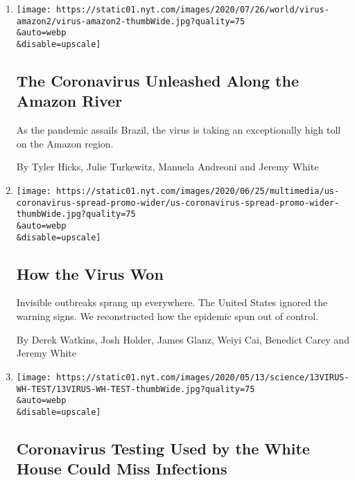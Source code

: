 \begin{enumerate}
\def\labelenumi{\arabic{enumi}.}
\item
  \href{/interactive/2020/07/25/world/americas/coronavirus-brazil-amazon.html}{}

  \texttt{[image: https://static01.nyt.com/images/2020/07/26/world/virus-amazon2/virus-amazon2-thumbWide.jpg?quality=75\\\&auto=webp\\\&disable=upscale]}

  \hypertarget{the-coronavirus-unleashed-along-the-amazon-river}{%
  \subsection{The Coronavirus Unleashed Along the Amazon
  River}\label{the-coronavirus-unleashed-along-the-amazon-river}}

  As the pandemic assails Brazil, the virus is taking an exceptionally
  high toll on the Amazon region.

  By Tyler Hicks, Julie Turkewitz, Manuela Andreoni and Jeremy White
\item
  \href{/interactive/2020/us/coronavirus-spread.html}{}

  \texttt{[image: https://static01.nyt.com/images/2020/06/25/multimedia/us-coronavirus-spread-promo-wider/us-coronavirus-spread-promo-wider-thumbWide.jpg?quality=75\\\&auto=webp\\\&disable=upscale]}

  \hypertarget{how-the-virus-won}{%
  \subsection{How the Virus Won}\label{how-the-virus-won}}

  Invisible outbreaks sprang up everywhere. The United States ignored
  the warning signs. We reconstructed how the epidemic spun out of
  control.

  By Derek Watkins, Josh Holder, James Glanz, Weiyi Cai, Benedict Carey
  and Jeremy White
\item
  \href{/2020/05/13/health/coronavirus-testing-white-house.html}{}

  \texttt{[image: https://static01.nyt.com/images/2020/05/13/science/13VIRUS-WH-TEST/13VIRUS-WH-TEST-thumbWide.jpg?quality=75\\\&auto=webp\\\&disable=upscale]}

  \hypertarget{coronavirus-testing-used-by-the-white-house-could-miss-infections}{%
  \subsection{Coronavirus Testing Used by the White House Could Miss
  Infections}\label{coronavirus-testing-used-by-the-white-house-could-miss-infections}}


\end{enumerate}
